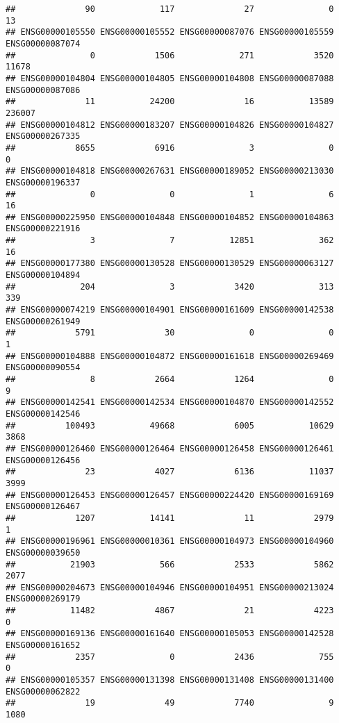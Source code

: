 \documentclass[
]{article}
\begin{document}
\begin{verbatim}
##              90             117              27               0              13 
## ENSG00000105550 ENSG00000105552 ENSG00000087076 ENSG00000105559 ENSG00000087074 
##               0            1506             271            3520           11678 
## ENSG00000104804 ENSG00000104805 ENSG00000104808 ENSG00000087088 ENSG00000087086 
##              11           24200              16           13589          236007 
## ENSG00000104812 ENSG00000183207 ENSG00000104826 ENSG00000104827 ENSG00000267335 
##            8655            6916               3               0               0 
## ENSG00000104818 ENSG00000267631 ENSG00000189052 ENSG00000213030 ENSG00000196337 
##               0               0               1               6              16 
## ENSG00000225950 ENSG00000104848 ENSG00000104852 ENSG00000104863 ENSG00000221916 
##               3               7           12851             362              16 
## ENSG00000177380 ENSG00000130528 ENSG00000130529 ENSG00000063127 ENSG00000104894 
##             204               3            3420             313             339 
## ENSG00000074219 ENSG00000104901 ENSG00000161609 ENSG00000142538 ENSG00000261949 
##            5791              30               0               0               1 
## ENSG00000104888 ENSG00000104872 ENSG00000161618 ENSG00000269469 ENSG00000090554 
##               8            2664            1264               0               9 
## ENSG00000142541 ENSG00000142534 ENSG00000104870 ENSG00000142552 ENSG00000142546 
##          100493           49668            6005           10629            3868 
## ENSG00000126460 ENSG00000126464 ENSG00000126458 ENSG00000126461 ENSG00000126456 
##              23            4027            6136           11037            3999 
## ENSG00000126453 ENSG00000126457 ENSG00000224420 ENSG00000169169 ENSG00000126467 
##            1207           14141              11            2979               1 
## ENSG00000196961 ENSG00000010361 ENSG00000104973 ENSG00000104960 ENSG00000039650 
##           21903             566            2533            5862            2077 
## ENSG00000204673 ENSG00000104946 ENSG00000104951 ENSG00000213024 ENSG00000269179 
##           11482            4867              21            4223               0 
## ENSG00000169136 ENSG00000161640 ENSG00000105053 ENSG00000142528 ENSG00000161652 
##            2357               0            2436             755               0 
## ENSG00000105357 ENSG00000131398 ENSG00000131408 ENSG00000131400 ENSG00000062822 
##              19              49            7740               9            1080 

\end{verbatim}
\end{document}
